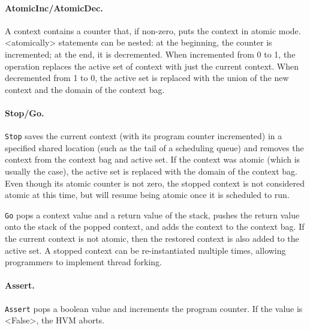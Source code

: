 \documentclass[twocolumn]{article}
\begin{document}
\paragraph{AtomicInc/AtomicDec.}  A context contains a counter that,
if non-zero, puts the context in atomic mode.
<{atomically}> statements can be nested: at the beginning, the
counter is incremented; at the end, it is decremented.
When incremented from 0 to 1, the operation replaces the active
set of context with just the current context.  When decremented
from 1 to 0, the active set is replaced with the union of the
new context and the domain of the context bag.

\paragraph{Stop/Go.} \texttt{Stop} saves the current context
(with its program counter incremented) in a specified shared location
(such as the tail of a scheduling queue) and removes the context
from the context bag and active set.  If the context was atomic
(which is usually the case), the active set is replaced with the
domain of the context bag.  Even though its atomic counter is not
zero, the stopped context is not considered atomic at this time,
but will resume being atomic once it is scheduled to run.

\texttt{Go} pops a context value and a return value of the stack,
pushes the return value onto the stack of the popped context, and adds
the context to the context bag.  If the current context is not atomic,
then the restored context is also added to the active set.
A stopped context can be re-instantiated multiple times, allowing
programmers to implement thread forking.

\paragraph{Assert.}  \texttt{Assert} pops a boolean value and increments
the program counter.  If the value is <{False}>, the HVM aborts.
\end{document}
